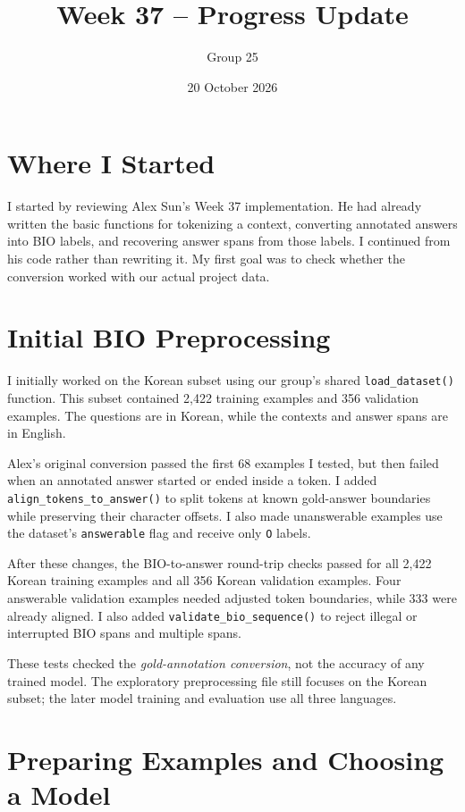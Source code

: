 \documentclass[a4paper,11pt]{article}
\title{Week 37 -- Progress Update}
\author{Group 25}
\date{20 October 2026}
\begin{document}
\maketitle

\section{Where I Started}

I started by reviewing Alex Sun's Week 37 implementation. He had already written the basic functions for tokenizing a context, converting annotated answers into BIO labels, and recovering answer spans from those labels. I continued from his code rather than rewriting it. My first goal was to check whether the conversion worked with our actual project data.

\section{Initial BIO Preprocessing}

I initially worked on the Korean subset using our group's shared \texttt{load\_dataset()} function. This subset contained 2,422 training examples and 356 validation examples. The questions are in Korean, while the contexts and answer spans are in English.

Alex's original conversion passed the first 68 examples I tested, but then failed when an annotated answer started or ended inside a token. I added \texttt{align\_tokens\_to\_answer()} to split tokens at known gold-answer boundaries while preserving their character offsets. I also made unanswerable examples use the dataset's \texttt{answerable} flag and receive only \texttt{O} labels.

After these changes, the BIO-to-answer round-trip checks passed for all 2,422 Korean training examples and all 356 Korean validation examples. Four answerable validation examples needed adjusted token boundaries, while 333 were already aligned. I also added \texttt{validate\_bio\_sequence()} to reject illegal or interrupted BIO spans and multiple spans.

These tests checked the \emph{gold-annotation conversion}, not the accuracy of any trained model. The exploratory preprocessing file still focuses on the Korean subset; the later model training and evaluation use all three languages.

\section{Preparing Examples and Choosing a Model}
\end{document}

